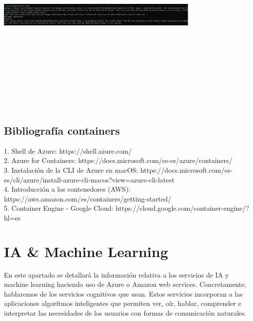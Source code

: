 \documentclass[english,runningheads,a4paper]{llncs}[2018/03/10]
\newenvironment{nscenter}
 {\parskip=0pt\par\nopagebreak\centering}
 {\par\noindent\ignorespacesafterend}
\begin{document}
\newline
\begin{nscenter}
\includegraphics[width=10cm,height=10cm,keepaspectratio]{./Contenedores/Googlecloud/50.png}
\end{nscenter}
\newpage
\subsection*{Bibliografía containers}

1. Shell de Azure: https://shell.azure.com/ \\
2. Azure for Containers: https://docs.microsoft.com/es-es/azure/containers/ \\
3. Instalación de la CLI de Azure en macOS: https://docs.microsoft.com/es-es/cli/azure/install-azure-cli-macos?view=azure-cli-latest \\
4. Introducción a los contenedores (AWS): https://aws.amazon.com/es/containers/getting-started/ \\
5. Container Engine - Google Cloud: https://cloud.google.com/container-engine/?hl=es

\newpage

\section{IA \& Machine Learning}
        En este apartado se detallará la información relativa a los servicios de
        IA y machine learning haciendo uso de Azure o Amazon web services. 
        Concretamente, hablaremos de los servicios cognitivos que usan. Estos 
        servicios incorporan a las aplicaciones algoritmos inteligentes que 
        permiten ver, oír, hablar, comprender e interpretar las necesidades de 
        los usuarios con formas de comunicación naturales.
    
\end{document}
